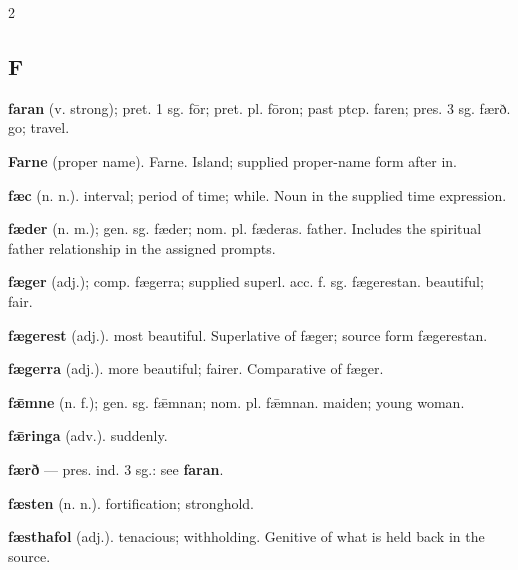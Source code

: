 \begin{multicols*}{2}
\subsection*{F}
\textbf{faran} (v. strong); pret. 1 sg. fōr; pret. pl. fōron; past ptcp. faren; pres. 3 sg. færð. go; travel.\par
\textbf{Farne} (proper name). Farne. Island; supplied proper-name form after in.\par
\textbf{fæc} (n. n.). interval; period of time; while. Noun in the supplied time expression.\par
\textbf{fæder} (n. m.); gen. sg. fæder; nom. pl. fæderas. father. Includes the spiritual father relationship in the assigned prompts.\par
\textbf{fæger} (adj.); comp. fægerra; supplied superl. acc. f. sg. fægerestan. beautiful; fair.\par
\textbf{fægerest} (adj.). most beautiful. Superlative of fæger; source form fægerestan.\par
\textbf{fægerra} (adj.). more beautiful; fairer. Comparative of fæger.\par
\textbf{fǣmne} (n. f.); gen. sg. fǣmnan; nom. pl. fǣmnan. maiden; young woman.\par
\textbf{fǣringa} (adv.). suddenly.\par
\textbf{færð} — pres. ind. 3 sg.: see \textbf{faran}.\par
\textbf{fæsten} (n. n.). fortification; stronghold.\par
\textbf{fæsthafol} (adj.). tenacious; withholding. Genitive of what is held back in the source.\par

\end{multicols*}
